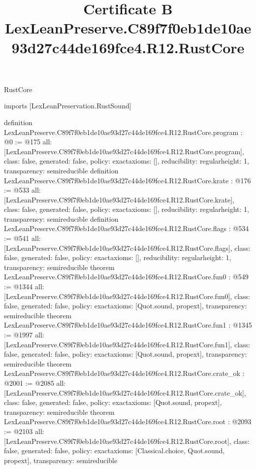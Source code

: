 \begin{lexlean}{RustCore}
\title{Certificate B LexLeanPreserve.C89f7f0eb1de10ae93d27c44de169fce4.R12.RustCore}
\begin{coremodule}
imports [LexLeanPreservation.RustSound]

definition LexLeanPreserve.C89f7f0eb1de10ae93d27c44de169fce4.R12.RustCore.program : @0 := @175 {
  all: [LexLeanPreserve.C89f7f0eb1de10ae93d27c44de169fce4.R12.RustCore.program],
  class: false,
  generated: false,
  policy: exact{axioms: []},
  reducibility: regular{height: 1},
  transparency: semireducible
}
definition LexLeanPreserve.C89f7f0eb1de10ae93d27c44de169fce4.R12.RustCore.krate : @176 := @533 {
  all: [LexLeanPreserve.C89f7f0eb1de10ae93d27c44de169fce4.R12.RustCore.krate],
  class: false,
  generated: false,
  policy: exact{axioms: []},
  reducibility: regular{height: 1},
  transparency: semireducible
}
definition LexLeanPreserve.C89f7f0eb1de10ae93d27c44de169fce4.R12.RustCore.flags : @534 := @541 {
  all: [LexLeanPreserve.C89f7f0eb1de10ae93d27c44de169fce4.R12.RustCore.flags],
  class: false,
  generated: false,
  policy: exact{axioms: []},
  reducibility: regular{height: 1},
  transparency: semireducible
}
theorem LexLeanPreserve.C89f7f0eb1de10ae93d27c44de169fce4.R12.RustCore.fun0 : @549 := @1344 {
  all: [LexLeanPreserve.C89f7f0eb1de10ae93d27c44de169fce4.R12.RustCore.fun0],
  class: false,
  generated: false,
  policy: exact{axioms: [Quot.sound, propext]},
  transparency: semireducible
}
theorem LexLeanPreserve.C89f7f0eb1de10ae93d27c44de169fce4.R12.RustCore.fun1 : @1345 := @1997 {
  all: [LexLeanPreserve.C89f7f0eb1de10ae93d27c44de169fce4.R12.RustCore.fun1],
  class: false,
  generated: false,
  policy: exact{axioms: [Quot.sound, propext]},
  transparency: semireducible
}
theorem LexLeanPreserve.C89f7f0eb1de10ae93d27c44de169fce4.R12.RustCore.crate_ok : @2001 := @2085 {
  all: [LexLeanPreserve.C89f7f0eb1de10ae93d27c44de169fce4.R12.RustCore.crate_ok],
  class: false,
  generated: false,
  policy: exact{axioms: [Quot.sound, propext]},
  transparency: semireducible
}
theorem LexLeanPreserve.C89f7f0eb1de10ae93d27c44de169fce4.R12.RustCore.root : @2093 := @2103 {
  all: [LexLeanPreserve.C89f7f0eb1de10ae93d27c44de169fce4.R12.RustCore.root],
  class: false,
  generated: false,
  policy: exact{axioms: [Classical.choice, Quot.sound, propext]},
  transparency: semireducible
}


\end{coremodule}
\end{lexlean}

